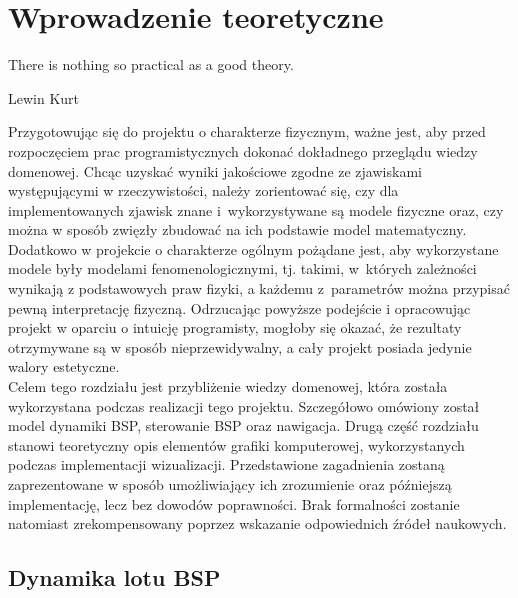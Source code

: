 \chapter{Wprowadzenie teoretyczne}

\epigraph{There is nothing so practical as a good theory.}{Lewin Kurt}

Przygotowując się do projektu o charakterze fizycznym, ważne jest, aby przed rozpoczęciem prac programistycznych dokonać dokładnego przeglądu wiedzy domenowej. Chcąc uzyskać wyniki jakościowe zgodne ze zjawiskami występującymi w rzeczywistości, należy zorientować się, czy dla implementowanych zjawisk znane i~wykorzystywane są modele fizyczne oraz, czy można w sposób zwięzły zbudować na ich podstawie model matematyczny. Dodatkowo w projekcie o charakterze ogólnym pożądane jest, aby wykorzystane modele były modelami fenomenologicznymi, tj. takimi, w~których zależności wynikają z podstawowych praw fizyki, a każdemu z~parametrów można przypisać pewną interpretację fizyczną. Odrzucając powyższe podejście i opracowując projekt w oparciu o intuicję programisty, mogłoby się okazać, że rezultaty otrzymywane są w sposób nieprzewidywalny, a cały projekt posiada jedynie walory estetyczne.\\

Celem tego rozdziału jest przybliżenie wiedzy domenowej, która została wykorzystana podczas realizacji tego projektu. Szczegółowo omówiony został model dynamiki BSP, sterowanie BSP oraz nawigacja. Drugą część rozdziału stanowi teoretyczny opis elementów grafiki komputerowej, wykorzystanych podczas implementacji wizualizacji. Przedstawione zagadnienia zostaną zaprezentowane w sposób umożliwiający ich zrozumienie oraz późniejszą implementację, lecz bez dowodów poprawności. Brak formalności zostanie natomiast zrekompensowany poprzez wskazanie odpowiednich źródeł naukowych.

\section{Dynamika lotu BSP}

